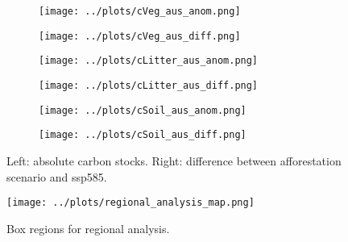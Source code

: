 \documentclass[]{article}
\begin{document}
\begin{figure}[H]
    \centering
    \begin{subfigure}[b]{0.4\linewidth}
        \texttt{[image: ../plots/cVeg\_aus\_anom.png]}
    \end{subfigure}
    \begin{subfigure}[b]{0.4\linewidth}
        \texttt{[image: ../plots/cVeg\_aus\_diff.png]}
    \end{subfigure}
    \begin{subfigure}[b]{0.4\linewidth}
        \texttt{[image: ../plots/cLitter\_aus\_anom.png]}
    \end{subfigure}
    \begin{subfigure}[b]{0.4\linewidth}
        \texttt{[image: ../plots/cLitter\_aus\_diff.png]}
    \end{subfigure}
    \begin{subfigure}[b]{0.4\linewidth}
        \texttt{[image: ../plots/cSoil\_aus\_anom.png]}
    \end{subfigure}
    \begin{subfigure}[b]{0.4\linewidth}
        \texttt{[image: ../plots/cSoil\_aus\_diff.png]}
    \end{subfigure}
    \caption{Left: absolute carbon stocks. Right: difference between afforestation scenario and ssp585.}
    \label{fig:aus_region}
\end{figure}

\begin{figure}[H]
    \centering
    \texttt{[image: ../plots/regional\_analysis\_map.png]}
    \caption{Box regions for regional analysis.}
    \label{fig:my_label}
\end{figure}
\end{document}
